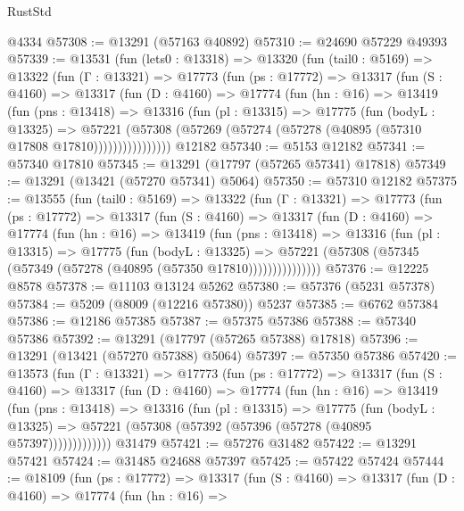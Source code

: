 \begin{lexlean}{RustStd}
\begin{coremodule}
    @4334
@57308 := @13291 (@57163 @40892)
@57310 := @24690 @57229 @49393
@57339 := @13531
    (fun (lets0 : @13318) =>
    @13320
      (fun (tail0 : @5169) =>
      @13322
        (fun (Γ : @13321) =>
        @17773
          (fun (ps : @17772) =>
          @13317
            (fun (S : @4160) =>
            @13317
              (fun (D : @4160) =>
              @17774
                (fun (hn : @16) =>
                @13419
                  (fun (pns : @13418) =>
                  @13316
                    (fun (pl : @13315) =>
                    @17775
                      (fun (bodyL : @13325) =>
                      @57221
                        (@57308
                          (@57269 (@57274 (@57278 (@40895 (@57310 @17808 @17810))))))))))))))))
    @12182
@57340 := @5153 @12182
@57341 := @57340 @17810
@57345 := @13291 (@17797 (@57265 @57341) @17818)
@57349 := @13291 (@13421 (@57270 @57341) @5064)
@57350 := @57310 @12182
@57375 := @13555
    (fun (tail0 : @5169) =>
    @13322
      (fun (Γ : @13321) =>
      @17773
        (fun (ps : @17772) =>
        @13317
          (fun (S : @4160) =>
          @13317
            (fun (D : @4160) =>
            @17774
              (fun (hn : @16) =>
              @13419
                (fun (pns : @13418) =>
                @13316
                  (fun (pl : @13315) =>
                  @17775
                    (fun (bodyL : @13325) =>
                    @57221 (@57308 (@57345 (@57349 (@57278 (@40895 (@57350 @17810)))))))))))))))
@57376 := @12225 @8578
@57378 := @11103 @13124 @5262
@57380 := @57376 (@5231 @57378)
@57384 := @5209 (@8009 (@12216 @57380)) @5237
@57385 := @6762 @57384
@57386 := @12186 @57385
@57387 := @57375 @57386
@57388 := @57340 @57386
@57392 := @13291 (@17797 (@57265 @57388) @17818)
@57396 := @13291 (@13421 (@57270 @57388) @5064)
@57397 := @57350 @57386
@57420 := @13573
    (fun (Γ : @13321) =>
    @17773
      (fun (ps : @17772) =>
      @13317
        (fun (S : @4160) =>
        @13317
          (fun (D : @4160) =>
          @17774
            (fun (hn : @16) =>
            @13419
              (fun (pns : @13418) =>
              @13316
                (fun (pl : @13315) =>
                @17775
                  (fun (bodyL : @13325) =>
                  @57221 (@57308 (@57392 (@57396 (@57278 (@40895 @57397)))))))))))))
    @31479
@57421 := @57276 @31482
@57422 := @13291 @57421
@57424 := @31485 @24688 @57397
@57425 := @57422 @57424
@57444 := @18109
    (fun (ps : @17772) =>
    @13317
      (fun (S : @4160) =>
      @13317
        (fun (D : @4160) =>
        @17774
          (fun (hn : @16) =>

\end{coremodule}
\end{lexlean}
